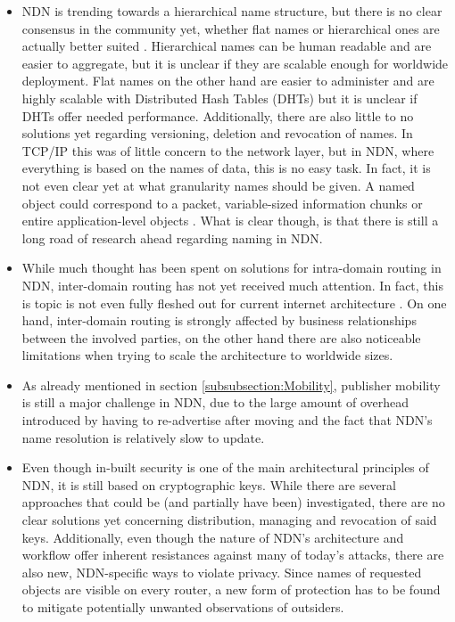 \begin{itemize}
	
	\item NDN is trending towards a hierarchical name structure, but there is no clear consensus in the community yet, whether flat names or hierarchical ones are actually better suited \cite{XVSF+13}. Hierarchical names can be human readable and are easier to aggregate, but it is unclear if they are scalable enough for worldwide deployment. Flat names on the other hand are easier to administer and are highly scalable with Distributed Hash Tables (DHTs) but it is unclear if DHTs offer needed performance. Additionally, there are also little to no solutions yet regarding versioning, deletion and revocation of names. In TCP/IP this was of little concern to the network layer, but in NDN, where everything is based on the names of data, this is no easy task. In fact, it is not even clear yet at what granularity names should be given. A named object could correspond to a packet, variable-sized information chunks or entire application-level objects \cite{XVSF+13}. What is clear though, is that there is still a long road of research ahead regarding naming in NDN.

	\item While much thought has been spent on solutions for intra-domain routing in NDN, inter-domain routing has not yet received much attention. In fact, this is topic is not even fully fleshed out for current internet architecture \cite{XVSF+13}. On one hand, inter-domain routing is strongly affected by business relationships between the involved parties, on the other hand there are also noticeable limitations when trying to scale the architecture to worldwide sizes. 

	\item As already mentioned in section \ref{subsubsection:Mobility}, publisher mobility is still a major challenge in NDN, due to the large amount of overhead introduced by having to re-advertise after moving and the fact that NDN's name resolution is relatively slow to update.

	\item Even though in-built security is one of the main architectural principles of NDN, it is still based on cryptographic keys. While there are several approaches that could be (and partially have been) investigated, there are no clear solutions yet concerning distribution, managing and revocation of said keys. Additionally, even though the nature of NDN's architecture and workflow offer inherent resistances against many of today's attacks, there are also new, NDN-specific ways to violate privacy. Since names of requested objects are visible on every router, a new form of protection has to be found to mitigate potentially unwanted observations of outsiders.


\end{itemize}
